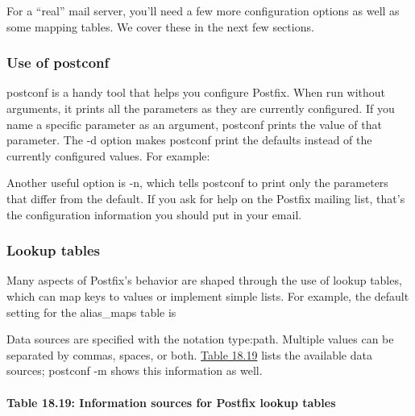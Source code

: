 For a ``real'' mail server, you'll need a few more configuration options
as well as some mapping tables. We cover these in the next few sections.

\subsubsection[Use of
{postconf}]{\texorpdfstring{\protect\hypertarget{part0026_split_061.htmlux5cux23_idTextAnchor1176}{}{}Use
of {postconf}}{Use of postconf}}

{\protect\hypertarget{part0026_split_061.htmlux5cux23_idIndexMarker2711}{}{}}{postconf
}is a handy tool that helps you configure Postfix. When run without
arguments, it prints all the parameters as they are currently
configured. If you name a specific parameter as an argument, {postconf}
prints the value of that parameter. The {-d} option makes {postconf}
print the defaults instead of the currently configured values. For
example:


Another useful option is {-n}, which tells {postconf} to print only the
parameters that differ from the default. If you ask for help on the
Postfix mailing list, that's the configuration information you should
put in your email.

\subsubsection[Lookup
tables]{\texorpdfstring{\protect\hypertarget{part0026_split_061.htmlux5cux23_idTextAnchor1177}{}{}Lookup
tables}{Lookup tables}}

\protect\hypertarget{part0026_split_061.htmlux5cux23_idIndexMarker2712}{}{}Many
aspects of Postfix's behavior are shaped through the use of lookup
tables, which can map keys to values or implement simple lists. For
example, the default setting for the {alias\_maps} table is


Data sources are specified with the notation {type:path}. Multiple
values can be separated by commas, spaces, or both.
\protect\hyperlink{part0026_split_061.htmlux5cux23_idTextAnchor1178}{Table
18.19} lists the available data sources; {postconf -m} shows this
information as well.

\paragraph[{Table 18.19: }Information sources for Postfix lookup
tables]{\texorpdfstring{{Table 18.19:
}\protect\hypertarget{part0026_split_061.htmlux5cux23_idTextAnchor1178}{}{}\protect\hypertarget{part0026_split_061.htmlux5cux23_idTextAnchor1179}{}{}Information
sources for Postfix lookup
tables}{Table 18.19: Information sources for Postfix lookup tables}}

